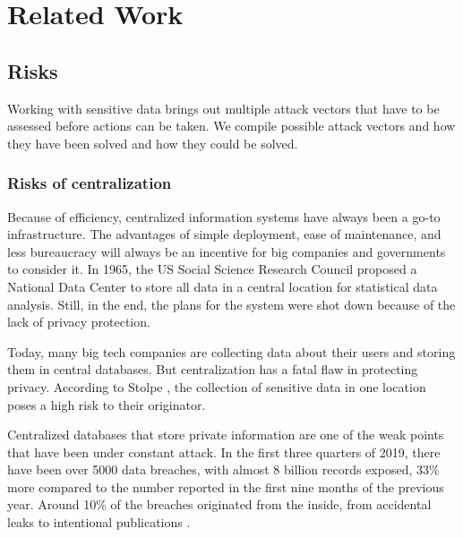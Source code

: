 
\chapter{Related Work}\label{chapter:relatedwork}
\section{Risks}
Working with sensitive data brings out multiple attack vectors that have to be assessed before actions can be taken. We compile possible attack vectors and how they have been solved and how they could be solved.

\subsection{Risks of centralization}
Because of efficiency, centralized information systems have always been a go-to infrastructure. The advantages of simple deployment, ease of maintenance, and less bureaucracy will always be an incentive for big companies and governments to consider it. In 1965, the US Social Science Research Council proposed a National Data Center to store all data in a central location for statistical data analysis. Still, in the end, the plans for the system were shot down because of the lack of privacy protection.

Today, many big tech companies are collecting data about their users and storing them in central databases. But centralization has a fatal flaw in protecting privacy. According to Stolpe \cite{DBLP:journals/sigkdd/Stolpe16}, the collection of sensitive data in one location poses a high risk to their originator.

 Centralized databases that store private information are one of the weak points that have been under constant attack. In the first three quarters of 2019, there have been over 5000 data breaches, with almost 8 billion records exposed, 33\% more compared to the number reported in the first nine months of the previous year. Around 10\% of the breaches originated from the inside, from accidental leaks to intentional publications \cite{helpnetsecurity}.

